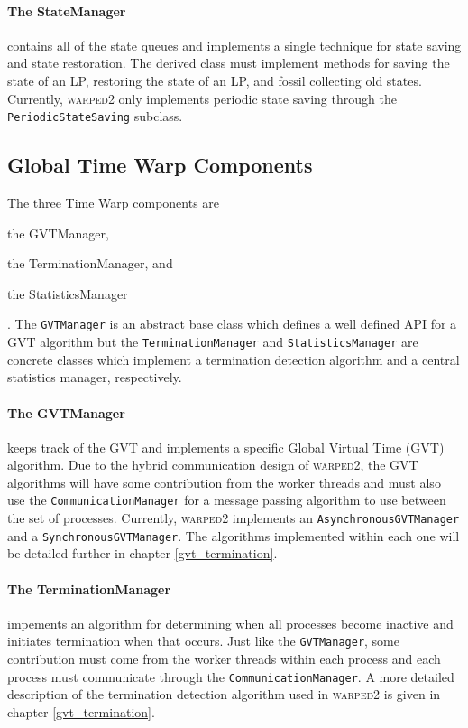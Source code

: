 \documentclass[11pt]{book}
\begin{document}
\paragraph{The StateManager} contains all of the state queues and implements a single technique
for state saving and state restoration.  The derived class must implement methods for saving the
state of an LP, restoring the state of an LP, and fossil collecting old states.  Currently,
\textsc{warped2} only implements periodic state saving through the \texttt{PeriodicStateSaving}
subclass.

\subsection{Global Time Warp Components}

The three Time Warp components are \begin{inparaenum}[(1)] \item the GVTManager, \item
the TerminationManager, and \item the StatisticsManager \end{inparaenum}.  The \texttt{GVTManager}
is an abstract base class which defines a well defined API for a GVT algorithm but the
\texttt{TerminationManager} and \texttt{StatisticsManager} are concrete classes which implement
a termination detection algorithm and a central statistics manager, respectively.

\paragraph{The GVTManager} keeps track of the GVT and implements a specific Global Virtual Time
(GVT) algorithm.  Due to the hybrid communication design of \textsc{warped2}, the GVT algorithms
will have some contribution from the worker threads and must also use the \texttt{CommunicationManager}
for a message passing algorithm to use between the set of processes.  Currently, \textsc{warped2}
implements an \texttt{AsynchronousGVTManager} and a \texttt{SynchronousGVTManager}.  The algorithms
implemented within each one will be detailed further in chapter \ref{gvt_termination}.

\paragraph{The TerminationManager} impements an algorithm for determining when all processes
become inactive and initiates termination when that occurs.  Just like the \texttt{GVTManager},
some contribution must come from the worker threads within each process and each process must
communicate through the \texttt{CommunicationManager}.  A more detailed description of the
termination detection algorithm used in \textsc{warped2} is given in chapter \ref{gvt_termination}.
\end{document}
